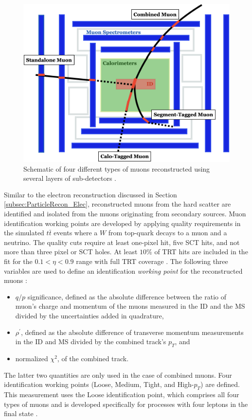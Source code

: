 \begin{figure}[!htbp]
    \centering
    \includegraphics[width=0.7\linewidth]{figures/LHC/MuonTypes.png}
    \caption{ Schematic of four different types of muons reconstructed using several layers of sub-detectors \cite{MuonFig}.\label{fig:MuonFig}}
\end{figure}

Similar to the electron reconstruction discussed in Section \ref{subsec:ParticleRecon_Elec}, reconstructed muons from the hard scatter are identified and isolated from the muons originating from secondary sources. Muon identification working points are developed by applying quality requirements in the simulated $t\bar{t}$ events where a $W$ from top-quark decays to a muon and a neutrino. The quality cuts require at least one-pixel hit, five SCT hits, and not more than three pixel or SCT holes. At least $10\%$ of TRT hits are included in the fit for the $0.1<\eta<0.9$ range with full TRT coverage \cite{MuonReco}. The following three variables are used to define an identification \textit{working point} for the reconstructed muons \cite{MuonReco}:
\begin{itemize}
    \item{$q/p$ significance, defined as the absolute difference between the ratio of muon's charge and momentum of the muons measured in the ID and the MS divided by the uncertainties added in quadrature, }
    \item{$\rho^{'}$, defined as the absolute difference of transverse momentum measurements in the ID and MS divided by the combined track's $p_{T}$, and } 
    \item{normalized $\chi ^{2}$, of the combined track.} 
\end{itemize}
The latter two quantities are only used in the case of combined muons. Four identification working points (Loose, Medium, Tight, and High-$p_{T}$) are defined. This measurement uses the Loose identification point, which comprises all four types of muons and is developed specifically for processes with four leptons in the final state  \cite{MuonReco}. 

